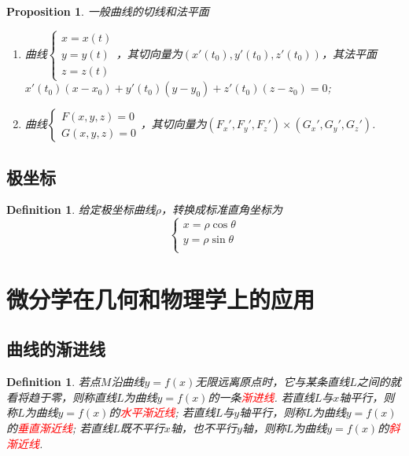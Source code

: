 \documentclass{article}
\newtheorem{proposition}[theorem]{Proposition}
\newtheorem{definition}[theorem]{Definition}
\newcommand{\redt}[1]{\textcolor{red}{#1}}
\begin{document}
\begin{proposition}
\rm 一般曲线的切线和法平面
\begin{enumerate}
	\item 曲线$\left\{ \begin{array}{ll} x=x(t) \\ y=y(t) \\ z=z(t) \end{array}	 \right.$，其切向量为$(x'(t_0),y'(t_0),z'(t_0))$，其法平面$x'(t_0)(x-x_0)+y'(t_0)(y-y_0) + z'(t_0)(z-z_0) = 0$; 
	\item 曲线$\left\{ \begin{array}{ll} F(x,y,z) = 0 \\ G(x,y,z) = 0 \end{array} \right.$，其切向量为$(F_x',F_y',F_z') \times (G_x',G_y',G_z')$. 
\end{enumerate}
\end{proposition}

\subsection{极坐标}

\begin{definition}
\rm 给定极坐标曲线$\rho$，转换成标准直角坐标为
$$
\left\{
\begin{array}{ll}
x = \rho \cos \theta \\
y = \rho \sin \theta \\
\end{array} \right.
$$
\end{definition}




\newpage
\section{微分学在几何和物理学上的应用}

\subsection{曲线的渐进线}

\begin{definition}
\rm 若点$M$沿曲线$y=f(x)$无限远离原点时，它与某条直线$L$之间的就看将趋于零，则称直线$L$为曲线$y=f(x)$的一条\redt{渐进线}. 若直线$L$与$x$轴平行，则称$L$为曲线$y=f(x)$的\redt{水平渐近线}; 若直线$L$与$y$轴平行，则称$L$为曲线$y=f(x)$的\redt{垂直渐近线}; 若直线$L$既不平行$x$轴，也不平行$y$轴，则称$L$为曲线$y=f(x)$的\redt{斜渐近线}. 
\end{definition}
\end{document}
